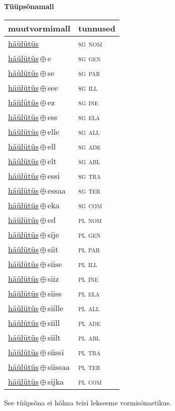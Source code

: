 

\vspace{3.5em}
\noindent \begin{minipage}{\textwidth}
\noindent \textbf{Tüüpsõnamall \,}\\

\begin{sideways}
\begin{tabular}{l l}
muutvormimall & tunnused \\
\hline
\underline{häülütüs} & \textsc{ sg nom } \\
\underline{häülütüs}\,$\oplus$\,e & \textsc{ sg gen } \\
\underline{häülütüs}\,$\oplus$\,se & \textsc{ sg par } \\
\underline{häülütüs}\,$\oplus$\,see & \textsc{ sg ill } \\
\underline{häülütüs}\,$\oplus$\,ez & \textsc{ sg ine } \\
\underline{häülütüs}\,$\oplus$\,ess & \textsc{ sg ela } \\
\underline{häülütüs}\,$\oplus$\,elle & \textsc{ sg all } \\
\underline{häülütüs}\,$\oplus$\,ell & \textsc{ sg ade } \\
\underline{häülütüs}\,$\oplus$\,elt & \textsc{ sg abl } \\
\underline{häülütüs}\,$\oplus$\,essi & \textsc{ sg tra } \\
\underline{häülütüs}\,$\oplus$\,essaa & \textsc{ sg ter } \\
\underline{häülütüs}\,$\oplus$\,eka & \textsc{ sg com } \\
\underline{häülütüs}\,$\oplus$\,ed & \textsc{ pl nom } \\
\underline{häülütüs}\,$\oplus$\,sije & \textsc{ pl gen } \\
\underline{häülütüs}\,$\oplus$\,siit & \textsc{ pl par } \\
\underline{häülütüs}\,$\oplus$\,siise & \textsc{ pl ill } \\
\underline{häülütüs}\,$\oplus$\,siiz & \textsc{ pl ine } \\
\underline{häülütüs}\,$\oplus$\,siiss & \textsc{ pl ela } \\
\underline{häülütüs}\,$\oplus$\,siille & \textsc{ pl all } \\
\underline{häülütüs}\,$\oplus$\,siill & \textsc{ pl ade } \\
\underline{häülütüs}\,$\oplus$\,siilt & \textsc{ pl abl } \\
\underline{häülütüs}\,$\oplus$\,siissi & \textsc{ pl tra } \\
\underline{häülütüs}\,$\oplus$\,siissaa & \textsc{ pl ter } \\
\underline{häülütüs}\,$\oplus$\,sijka & \textsc{ pl com } \\
\end{tabular}
\end{sideways}
\label{tab:tüüpsõnamall-häülütüs}

\end{minipage}

 
\vspace{1em}
\noindent See tüüpsõna ei hõlma teisi lekseeme vormi\-sõnastikus.
